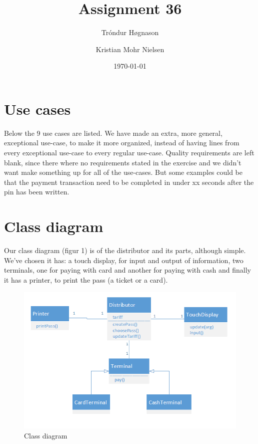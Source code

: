\documentclass[pdftex,12pt,a4paper]{article}
\begin{document}
\title{Assignment 36}
\author{Tróndur Høgnason \and  Kristian Mohr Nielsen}
\date{\today}
\maketitle
\pagebreak

\section{Use cases}
Below the 9 use cases are listed. We have made an extra, more general, exceptional use-case, to make it more organized, instead of having lines from every exceptional use-case to every regular use-case. Quality requirements are left blank, since there where no requirements stated in the exercise and we didn't want make something up for all of the use-cases. But some examples could be that the payment transaction need to be completed in under xx seconds after the pin has been written. 


\pagebreak

\pagebreak

\pagebreak

\pagebreak

\pagebreak

\pagebreak

\pagebreak

\pagebreak

\pagebreak

\section{Class diagram}
Our class diagram (figur 1) is of the distributor and its parts, although simple. We've chosen it has: a touch display, for input and output of information, two terminals, one for paying with card and another for paying with cash and finally it has a printer, to print the pass (a ticket or a card).
\begin{figure}[h]
\centering
\includegraphics[scale = 0.9]{class.png}
\caption{Class diagram}
\end{figure}
\end{document}
